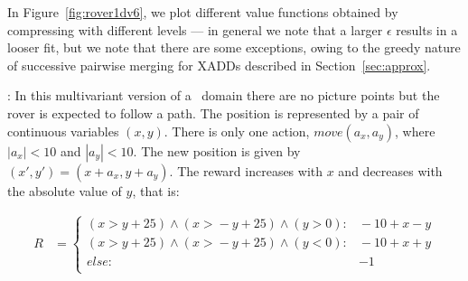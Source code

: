 In Figure~\ref{fig:rover1dv6}, we plot different value functions obtained by compressing with different levels --- in general we note that a larger $\epsilon$ results in a looser fit, but we note that there are some exceptions, owing to the greedy nature of successive pairwise merging for XADDs described in Section~\ref{sec:approx}.

\MarsRoverBi: In this multivariant version of a \MarsRover~domain there are no picture points but the rover is expected to follow a path. The position is represented by a pair of continuous variables $(x,y)$. There is only one action, $move(a_x,a_y)$, where $|a_x| < 10$ and $|a_y| < 10$. The new position is given by $(x',y') = ( x+a_x, y+a_y)$. The reward increases with $x$ and decreases with the absolute value of $y$, that is:

\vspace{-6mm}
{\footnotesize
\begin{align*}
R & = \begin{cases}
(x \!>\! y +25) \wedge (x \!>\! - y  +25) \wedge (y \!>\!0): &\!\!-10 + x -y\\
(x \!>\! y +25) \wedge (x \!>\! - y  +25) \wedge (y \!<\!0): &\!\!-10 + x +y\\
else: & -1\\
\end{cases}
\end{align*}}
\vspace{-6mm}

